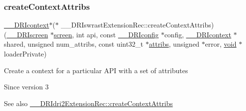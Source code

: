 \mbox{\label{struct_____d_r_iswrast_extension_rec_a2432fdc12df7ee3feb1e31fa8efc8c71}} 
\subsubsection{\texorpdfstring{create\+Context\+Attribs}{createContextAttribs}}
{\footnotesize\ttfamily \hyperlink{dri__interface_8h_a3fd295cba82b5a3d79f1ee7e12bfb908}{\+\_\+\+\_\+\+D\+R\+Icontext}$\ast$($\ast$ \+\_\+\+\_\+\+D\+R\+Iswrast\+Extension\+Rec\+::create\+Context\+Attribs) (\hyperlink{dri__interface_8h_a9961b01d421ee1fd6ed3c05acc9ca561}{\+\_\+\+\_\+\+D\+R\+Iscreen} $\ast$\hyperlink{cad_8h_ae04e09e4e3831bfc1632c509ae37dcec}{screen}, int api, const \hyperlink{dri__interface_8h_aeac81999efbbf8b1d6886338e3ea24d9}{\+\_\+\+\_\+\+D\+R\+Iconfig} $\ast$config, \hyperlink{dri__interface_8h_a3fd295cba82b5a3d79f1ee7e12bfb908}{\+\_\+\+\_\+\+D\+R\+Icontext} $\ast$shared, unsigned num\+\_\+attribs, const uint32\+\_\+t $\ast$\hyperlink{glext_8h_af53ceb1060941f33639f84f48d5b9273}{attribs}, unsigned $\ast$error, \hyperlink{_s_d_l__opengles2__gl2ext_8h_ae5d8fa23ad07c48bb609509eae494c95}{void} $\ast$loader\+Private)}

Create a context for a particular A\+PI with a set of attributes

\begin{DoxySince}{Since}
version 3
\end{DoxySince}
\begin{DoxySeeAlso}{See also}
\hyperlink{struct_____d_r_idri2_extension_rec_acfac8ddb8a1248baf2e5863ea7132f11}{\+\_\+\+\_\+\+D\+R\+Idri2\+Extension\+Rec\+::create\+Context\+Attribs} 
\end{DoxySeeAlso}
\mbox{\label{struct_____d_r_iswrast_extension_rec_aecf9ead53dd56266c68a332b8f396fdf}} 

